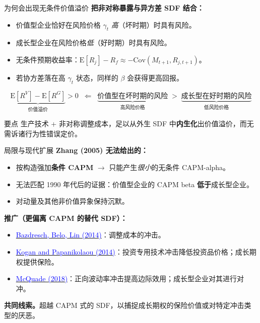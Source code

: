 \documentclass{beamer}
\begin{document}
\begin{frame}{为何会出现无条件价值溢价}
    \textbf{把非对称暴露与异方差 SDF 结合：}
    \begin{itemize}
        \item 价值型企业恰好在风险价格 $\gamma_t$ \textit{高}（坏时期）时具有风险。
        \item 成长型企业在风险价格\textit{低}（好时期）时具有风险。
        \item 无条件预期收益率：$\mathrm{E}[R_j] - R_f \approx -\mathrm{Cov}(M_{t+1}, R_{j,t+1})$。
        \item 若协方差落在高 $\gamma_t$ 状态，同样的 $\beta$ 会获得更高回报。
    \end{itemize}

    \vspace{0.2cm}
    \begin{equation*}
        \underbrace{\mathrm{E}[R^V] - \mathrm{E}[R^G]}_{\text{价值溢价}} > 0
        \;\;\Leftarrow\;\;
        \underbrace{\text{价值型在坏时期的风险}}_{\text{高风险价格}}
        \;>\;
        \underbrace{\text{成长型在好时期的风险}}_{\text{低风险价格}}
    \end{equation*}

    \vspace{0.1cm}
    \begin{block}{要点}
        生产技术 + 非对称调整成本，足以从外生 SDF 中\textbf{内生化}出价值溢价，而无需诉诸行为性错误定价。
    \end{block}
\end{frame}

\begin{frame}{局限与现代扩展}
    \textbf{Zhang (2005) 无法给出的：}
    \begin{itemize}
        \item 按构造强加\textbf{条件 CAPM} $\rightarrow$ 只能产生\textit{很小}的无条件 CAPM-alpha。
        \item 无法匹配 1990 年代后的证据：价值型企业的 CAPM beta \textbf{低于}成长型企业。
        \item 对动量及其他非价值异象保持沉默。
    \end{itemize}

    \vspace{0.2cm}
    \textbf{推广（更偏离 CAPM 的替代 SDF）：}
    \begin{itemize}
        \item \href{https://doi.org/10.1093/rfs/hht067}{\textcolor{blue}{Bazdresch, Belo, Lin (2014)}}：调整成本的冲击。
        \item \href{https://doi.org/10.1111/jofi.12080}{\textcolor{blue}{Kogan and Papanikolaou (2014)}}：投资专用技术冲击降低投资品价格；成长期权提供保险。
        \item \href{https://doi.org/10.1093/rfs/hhx135}{\textcolor{blue}{McQuade (2018)}}：正向波动率冲击提高边际效用；成长型企业对其进行对冲。
    \end{itemize}

    \vspace{0.1cm}
    \textbf{共同线索。}超越 CAPM 式的 SDF，以捕捉成长期权的保险价值或对特定冲击类型的厌恶。
\end{frame}
\end{document}

